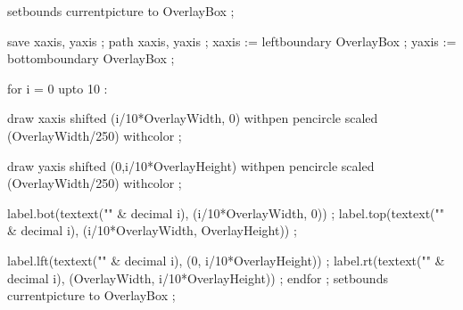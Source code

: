 
\ifconditional \simpleslidesHighlight
  \ifconditional \simpleslidesGrid
    \ifconditional \simpleslidesSubGrid
    \fi
  \fi
 \ifcase \simpleslidesHighlightAlternative \or
   \or
    \or
    \fi
  \fi
  setbounds currentpicture to OverlayBox ;
\stopuseMPgraphic


  save xaxis, yaxis ; path xaxis, yaxis ;
  xaxis := leftboundary OverlayBox ;
  yaxis := bottomboundary OverlayBox ;


  for i = 0 upto 10 :

    draw xaxis shifted (i/10*OverlayWidth, 0) 
               withpen pencircle scaled (OverlayWidth/250) 
               withcolor \MPcolor\simpleslidesGridColor ;

    draw yaxis shifted (0,i/10*OverlayHeight) 
               withpen pencircle scaled (OverlayWidth/250) 
               withcolor \MPcolor\simpleslidesGridColor ;

    label.bot(textext("\ix {}" & decimal i),
              (i/10*OverlayWidth, 0)) ;
    label.top(textext("\ix {}" & decimal i),
              (i/10*OverlayWidth, OverlayHeight)) ;

    label.lft(textext("\ix {}" & decimal i),
              (0, i/10*OverlayHeight)) ;
    label.rt(textext("\ix {}" & decimal i),
              (OverlayWidth, i/10*OverlayHeight)) ;
  endfor ;
  setbounds currentpicture to OverlayBox ;
\stopuseMPgraphic



